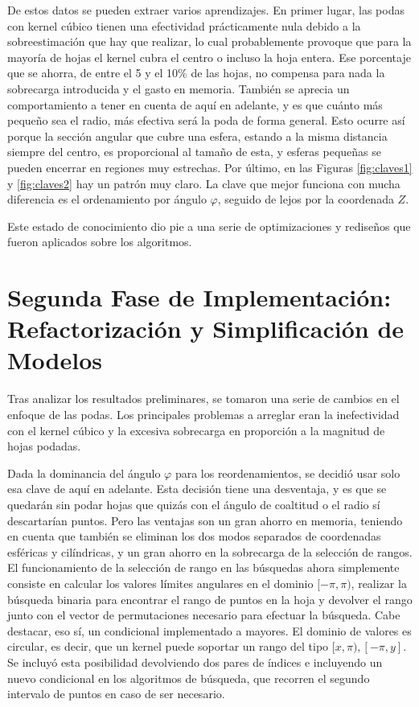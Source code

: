 De estos datos se pueden extraer varios aprendizajes. En primer lugar, las podas con kernel cúbico tienen una efectividad prácticamente nula debido a la sobreestimación que hay que realizar, lo cual probablemente provoque que para la mayoría de hojas el kernel cubra el centro o incluso la hoja entera. Ese porcentaje que se ahorra, de entre el 5 y el 10\% de las hojas, no compensa para nada la sobrecarga introducida y el gasto en memoria. También se aprecia un comportamiento a tener en cuenta de aquí en adelante, y es que cuánto más pequeño sea el radio, más efectiva será la poda de forma general. Esto ocurre así porque la sección angular que cubre una esfera, estando a la misma distancia siempre del centro, es proporcional al tamaño de esta, y esferas pequeñas se pueden encerrar en regiones muy estrechas. Por último, en las Figuras \ref{fig:claves1} y \ref{fig:claves2} hay un patrón muy claro. La clave que mejor funciona con mucha diferencia es el ordenamiento por ángulo $\varphi$, seguido de lejos por la coordenada $Z$.

Este estado de conocimiento dio pie a una serie de optimizaciones y rediseños que fueron aplicados sobre los algoritmos.

\section{Segunda Fase de Implementación: Refactorización y Simplificación de Modelos}
Tras analizar los resultados preliminares, se tomaron una serie de cambios en el enfoque de las podas. Los principales problemas a arreglar eran la inefectividad con el kernel cúbico y la excesiva sobrecarga en proporción a la magnitud de hojas podadas.

Dada la dominancia del ángulo $\varphi$ para los reordenamientos, se decidió usar solo esa clave de aquí en adelante. Esta decisión tiene una desventaja, y es que se quedarán sin podar hojas que quizás con el ángulo de coaltitud o el radio sí descartarían puntos. Pero las ventajas son un gran ahorro en memoria, teniendo en cuenta que también se eliminan los dos modos separados de coordenadas esféricas y cilíndricas, y un gran ahorro en la sobrecarga de la selección de rangos. El funcionamiento de la selección de rango en las búsquedas ahora simplemente consiste en calcular los valores límites angulares en el dominio $[-\pi, \pi )$, realizar la búsqueda binaria para encontrar el rango de puntos en la hoja y devolver el rango junto con el vector de permutaciones necesario para efectuar la búsqueda. Cabe destacar, eso sí, un condicional implementado a mayores. El dominio de valores es circular, es decir, que un kernel puede soportar un rango del tipo $[x, \pi ), [-\pi, y]$. Se incluyó esta posibilidad devolviendo dos pares de índices e incluyendo un nuevo condicional en los algoritmos de búsqueda, que recorren el segundo intervalo de puntos en caso de ser necesario.

